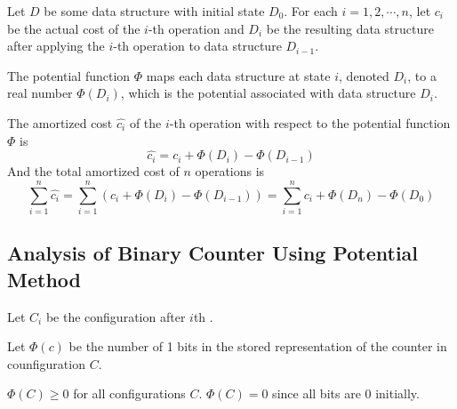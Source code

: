 \begin{definition} 
    Let $D$ be some data structure with initial state $D_0$. For each $i = 1,2,\cdots,n$, let $c_i$ be the actual cost of the $i$-th operation and $D_i$ be the resulting data structure after applying the $i$-th operation to data structure $D_{i-1}$.

    The potential function $\Phi$ maps each data structure at state $i$, denoted $D_i$, to a real number $\Phi(D_i)$, which is the potential associated with data structure $D_i$.

    The amortized cost $\hat{c_i}$ of the $i$-th operation with respect to the potential function $\Phi$ is
    $$
    \hat{c_i} = c_i + \Phi(D_i) - \Phi(D_{i-1})
    $$
    And the total amortized cost of $n$ operations is
    $$
    \sum_{i=1}^{n} \hat{c_i} = \sum_{i=1}^{n} \left( c_i + \Phi(D_i) - \Phi(D_{i-1}) \right) = \sum_{i=1}^{n} c_i + \Phi(D_n) - \Phi(D_0)
    $$
\end{definition}

\subsection{Analysis of Binary Counter Using Potential Method}

Let $C_i$ be the configuration after $i$th .

Let $\Phi(c)$ be the number of 1 bits in the stored representation of the counter in counfiguration $C$.

$\Phi(C) \geq 0$ for all configurations $C$. $\Phi(C) = 0$ since all bits are 0 initially.